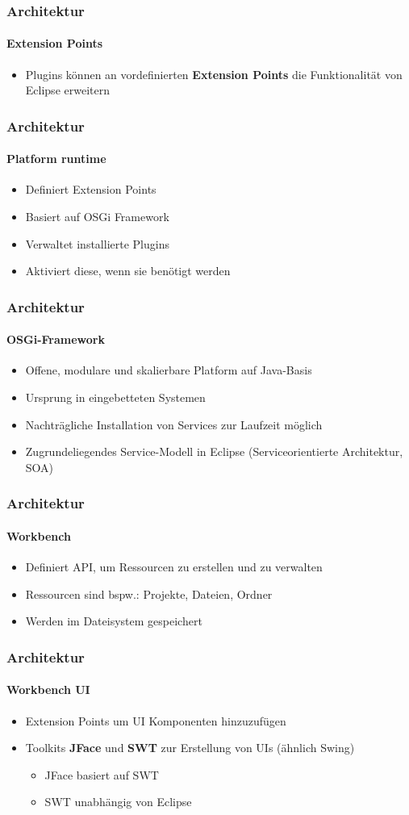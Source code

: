 {\begin{frame}
	\frametitle{Architektur}
	\framesubtitle{Extension Points}
	\begin{itemize}
		\item Plugins können an vordefinierten \textbf{Extension Points} die Funktionalität von Eclipse erweitern
	\end{itemize}
\end{frame}

\begin{frame}
  \frametitle{Architektur}
  \framesubtitle{Platform runtime}
  \begin{itemize}
    \item Definiert Extension Points
    \item Basiert auf OSGi Framework
    \item Verwaltet installierte Plugins
    \item Aktiviert diese, wenn sie benötigt werden
  \end{itemize}
\end{frame}

\begin{frame}
  \frametitle{Architektur}
  \framesubtitle{OSGi-Framework}
  \begin{itemize}
    \item Offene, modulare und skalierbare Platform auf Java-Basis
    \item Ursprung in eingebetteten Systemen
    \item Nachträgliche Installation von Services zur Laufzeit möglich
    \item Zugrundeliegendes Service-Modell in Eclipse (Serviceorientierte Architektur, SOA)
  \end{itemize}
\end{frame}

\begin{frame}
  \frametitle{Architektur}
  \framesubtitle{Workbench}
  \begin{itemize}
    \item Definiert API, um Ressourcen zu erstellen und zu verwalten
    \item Ressourcen sind bspw.: Projekte, Dateien, Ordner
    \item Werden im Dateisystem gespeichert
  \end{itemize}
\end{frame}

\begin{frame}
  \frametitle{Architektur}
  \framesubtitle{Workbench UI}
  \begin{itemize}
    \item Extension Points um UI Komponenten hinzuzufügen
    \item Toolkits \textbf{JFace} und \textbf{SWT} zur Erstellung von UIs (ähnlich Swing)
    \begin{itemize}
    	\item JFace basiert auf SWT
    	\item SWT unabhängig von Eclipse
    \end{itemize}
  \end{itemize}
\end{frame}

}
